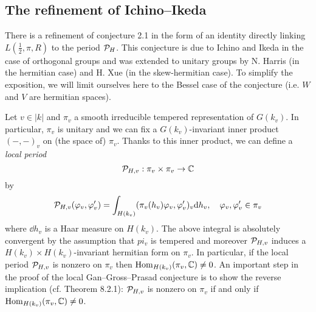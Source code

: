 \subsection{The refinement of Ichino--Ikeda}


There is a refinement of conjecture 2.1 in the form of an identity directly linking $L(\frac{1}{2}, \pi, R)$ to the period $\mathcal{P}_H$.
This conjecture is due to Ichino and Ikeda \cite{ichino2010periods} in the case of orthogonal groups and was extended to unitary groups by N. Harris \cite{harris2014refined} (in the hermitian case) and
H. Xue \cite{xue2017refined} (in the skew-hermitian case).
To simplify the exposition, we will limit ourselves here to the Bessel case of the conjecture (i.e. $W$ and $V$ are hermitian spaces).


Let $v \in |k|$ and $\pi_v$ a smooth irreducible tempered representation of $G(k_v)$.
In particular, $\pi_v$ is unitary and we can fix a $G(k_v)$-invariant inner product $(-,-)_v$ on (the space of) $\pi_v$.
Thanks to this inner product, we can define a \emph{local period}
\[
    \mathcal{P}_{H, v}: \pi_v \times \pi_v \to \mathbb{C}
\]
by
\[
    \mathcal{P}_{H, v}(\varphi_v, \varphi_v') = \int_{H(k_v)} (\pi_v(h_v) \varphi_v, \varphi_v')_v \mathrm{d} h_v, \quad \varphi_v, \varphi_v' \in \pi_v
\]
where $\dd h_v$ is a Haar measure on $H(k_v)$.
The above integral is absolutely convergent by the assumption that $pi_v$ is tempered and moreover $\mathcal{P}_{H, v}$ induces a $H(k_v) \times H(k_v)$-invariant hermitian form on $\pi_v$.
In particular, if the local period $\mathcal{P}_{H, v}$ is nonzero on $\pi_v$ then $\mathrm{Hom}_{H(k_v)}(\pi_v, \mathbb{C}) \neq 0$.
An important step in the proof of the local Gan--Gross--Prasad conjecture is to show the reverse implication (cf. \cite{beuzart2015local} Theorem 8.2.1): $\mathcal{P}_{H, v}$ is nonzero on $\pi_v$ if and only if $\mathrm{Hom}_{H(k_v)}(\pi_v, \mathbb{C}) \neq 0$.

